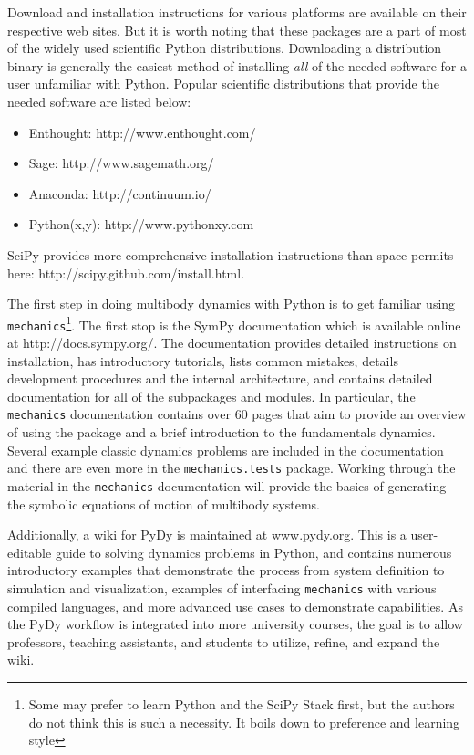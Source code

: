 \documentclass[twocolumn,10pt]{asme2e}
\begin{document}
Download and installation instructions for various platforms are available on
their respective web sites. But it is worth noting that these packages are a
part of most of the widely used scientific Python distributions. Downloading a
distribution binary is generally the easiest method of installing \emph{all} of
the needed software for a user unfamiliar with Python.
Popular scientific distributions that provide the needed software are listed
below:
%
\begin{itemize}
  \item Enthought: http://www.enthought.com/
  \item Sage: http://www.sagemath.org/
  \item Anaconda: http://continuum.io/
  \item Python(x,y): http://www.pythonxy.com
\end{itemize}

SciPy provides more comprehensive installation instructions than space permits
here: http://scipy.github.com/install.html.

The first step in doing multibody dynamics with Python is to get familiar using
\verb|mechanics|\footnote{Some may prefer to learn Python and the SciPy Stack
first, but the authors do not think this is such a necessity. It boils down to
preference and learning style}. The first stop is the SymPy documentation which
is available online at http://docs.sympy.org/. The documentation provides
detailed instructions on installation, has introductory tutorials, lists common
mistakes, details development procedures and the internal architecture, and
contains detailed documentation for all of the subpackages and modules. In
particular, the \verb|mechanics| documentation contains over 60 pages that aim
to provide an overview of using the package and a brief introduction to the
fundamentals dynamics. Several example classic dynamics problems are included
in the documentation and there are even more in the \verb|mechanics.tests|
package. Working through the material in the \verb|mechanics| documentation
will provide the basics of generating the symbolic equations of motion of
multibody systems.

Additionally, a wiki for PyDy is maintained at www.pydy.org. This is a
user-editable guide to solving dynamics problems in Python, and contains
numerous introductory examples that demonstrate the process from system
definition to simulation and visualization, examples of interfacing
\verb|mechanics| with various compiled languages, and more advanced use cases
to demonstrate capabilities. As the PyDy workflow is integrated into more
university courses, the goal is to allow professors, teaching assistants, and
students to utilize, refine, and expand the wiki.
\end{document}

